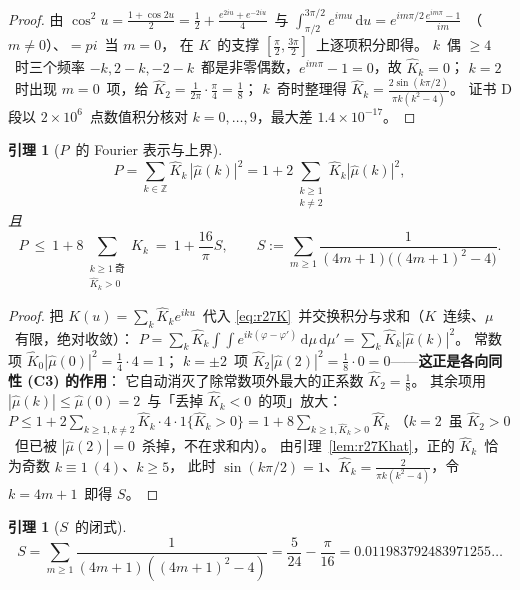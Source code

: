 \documentclass[UTF8,11pt]{ctexart}
\newtheorem{lemma}[theorem]{引理}
\theoremstyle{definition}
\newcommand{\dd}{\,\mathrm{d}}
\newcommand{\Z}{\mathbb{Z}}
\begin{document}
\begin{proof}
由 $\cos^2u=\frac{1+\cos2u}2=\frac12+\frac{e^{2iu}+e^{-2iu}}4$~与
$\int_{\pi/2}^{3\pi/2}e^{imu}\dd u=e^{im\pi/2}\frac{e^{im\pi}-1}{im}$~（$m\ne0$）、$=pi$~当 $m=0$，
在 $K$~的支撑 $[\frac\pi2,\frac{3\pi}2]$~上逐项积分即得。
$k$~偶 $\ge4$~时三个频率 $-k,2-k,-2-k$~都是非零偶数，$e^{im\pi}-1=0$，故 $\widehat K_k=0$；
$k=2$~时出现 $m=0$~项，给 $\widehat K_2=\frac1{2\pi}\cdot\frac\pi4=\frac18$；
$k$~奇时整理得 $\widehat K_k=\frac{2\sin(k\pi/2)}{\pi k(k^2-4)}$。
证书 D 段以 $2\times10^6$~点数值积分核对 $k=0,\dots,9$，最大差 $1.4\times10^{-17}$。
\end{proof}

\begin{lemma}[$P$~的 Fourier 表示与上界]\label{lem:r27fourier}
\begin{equation}\label{eq:r27Pfourier}
P=\sum_{k\in\Z}\widehat K_k\,|\widehat\mu(k)|^2
=1+2\!\!\sum_{\substack{k\ge1\\ k\ne2}}\!\!\widehat K_k|\widehat\mu(k)|^2 ,
\end{equation}
且
\begin{equation}\label{eq:r27Pbound}
P\ \le\ 1+8\!\!\sum_{\substack{k\ge1\ \text{奇}\\ \widehat K_k>0}}\!\!\widehat K_k
\ =\ 1+\frac{16}\pi S,\qquad
S:=\sum_{m\ge1}\frac1{(4m+1)\bigl((4m+1)^2-4\bigr)} .
\end{equation}
\end{lemma}

\begin{proof}
把 $K(u)=\sum_k\widehat K_ke^{iku}$~代入 \eqref{eq:r27K}~并交换积分与求和（$K$~连续、$\mu$~有限，绝对收敛）：
$P=\sum_k\widehat K_k\int\!\!\int e^{ik(\varphi-\varphi')}\dd\mu\dd\mu'
=\sum_k\widehat K_k|\widehat\mu(k)|^2$。
常数项 $\widehat K_0|\widehat\mu(0)|^2=\frac14\cdot4=1$；
$k=\pm2$~项 $\widehat K_2|\widehat\mu(2)|^2=\frac18\cdot0=0$——\textbf{这正是各向同性 (C3) 的作用}：
它自动消灭了除常数项外最大的正系数 $\widehat K_2=\frac18$。
其余项用 $|\widehat\mu(k)|\le\widehat\mu(0)=2$~与「丢掉 $\widehat K_k<0$~的项」放大：
$P\le1+2\sum_{k\ge1,k\ne2}\widehat K_k\cdot4\cdot1\{\widehat K_k>0\}
=1+8\sum_{k\ge1,\widehat K_k>0}\widehat K_k$
（$k=2$~虽 $\widehat K_2>0$~但已被 $|\widehat\mu(2)|=0$~杀掉，不在求和内）。
由引理~\ref{lem:r27Khat}，正的 $\widehat K_k$~恰为奇数 $k\equiv1\ (4)$、$k\ge5$，
此时 $\sin(k\pi/2)=1$、$\widehat K_k=\frac2{\pi k(k^2-4)}$，令 $k=4m+1$~即得 $S$。
\end{proof}

\begin{lemma}[$S$~的闭式]\label{lem:r27S}
\begin{equation}\label{eq:r27S}
S=\sum_{m\ge1}\frac1{(4m+1)((4m+1)^2-4)}=\frac5{24}-\frac\pi{16}=0.011983792483971255\ldots
\end{equation}
\end{lemma}
\end{document}
